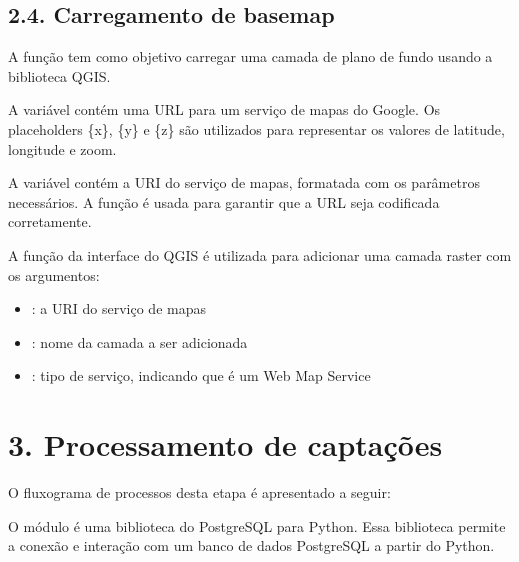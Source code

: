 \documentclass[a4paper,10pt,brazil]{sphinxmanual}
\begin{document}
\subsection{2.4.  Carregamento de basemap}
\label{\detokenize{2inicializacaoMapa:carregamento-de-basemap}}
\sphinxAtStartPar
A função  tem como objetivo carregar uma camada de plano de fundo usando a biblioteca QGIS.

\sphinxAtStartPar
A variável  contém uma URL para um serviço de mapas do Google. Os placeholders \{x\}, \{y\} e \{z\} são utilizados para representar os valores de latitude, longitude e zoom.

\sphinxAtStartPar
A variável  contém a URI do serviço de mapas, formatada com os parâmetros necessários. A função  é usada para garantir que a URL seja codificada corretamente.

\sphinxAtStartPar
A função  da interface do QGIS é utilizada para adicionar uma camada raster com os argumentos:
\begin{itemize}
\item {} 
\sphinxAtStartPar
{}: a URI do serviço de mapas

\item {} 
\sphinxAtStartPar
{}: nome da camada a ser adicionada

\item {} 
\sphinxAtStartPar
{}: tipo de serviço, indicando que é um Web Map Service

\end{itemize}

\sphinxstepscope


\section{3. Processamento de captações}
\label{\detokenize{3processamentoCaptacao:processamento-de-captacoes}}\label{\detokenize{3processamentoCaptacao::doc}}
\sphinxAtStartPar
O fluxograma de processos desta etapa é apresentado a seguir:


\sphinxAtStartPar
O módulo  é uma biblioteca do PostgreSQL para Python. Essa biblioteca permite a conexão e interação com um banco de dados PostgreSQL a partir do Python.
\end{document}
